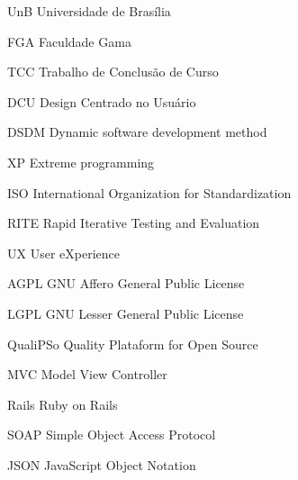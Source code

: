 \begin{siglas}
  \item[UnB] Universidade de Brasília
  \item[FGA] Faculdade Gama
  \item[TCC] Trabalho de Conclusão de Curso
  \item[DCU] Design Centrado no Usuário
  \item[DSDM] Dynamic software development method
  \item[XP] Extreme programming
  \item[ISO] International Organization for Standardization
  \item[RITE] Rapid Iterative Testing and Evaluation
  \item[UX] User eXperience
  \item[AGPL] GNU Affero General Public License
  \item[LGPL] GNU Lesser General Public License
  \item[QualiPSo] Quality Plataform for Open Source
  \item[MVC] Model View Controller
  \item[Rails] Ruby on Rails
  \item[SOAP] Simple Object Access Protocol
  \item[JSON] JavaScript Object Notation 
\end{siglas}
